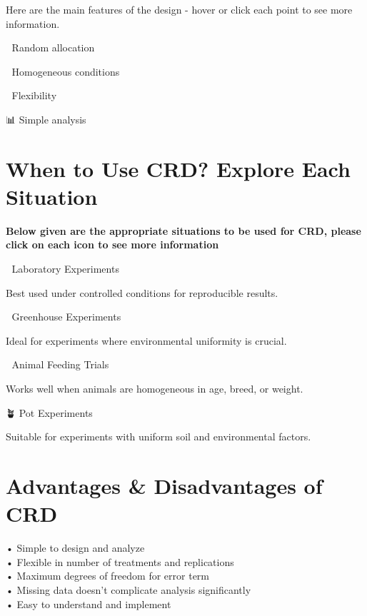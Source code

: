 \documentclass[
  letterpaper,
  DIV=11,
  numbers=noendperiod]{scrartcl}
\begin{document}
Here are the main features of the design - hover or click each point to
see more information.

{🎲 Random allocation}

{🌿 Homogeneous conditions}

{🔄 Flexibility}

{📊 Simple analysis}

\hypertarget{sec-results}{%
\section{When to Use CRD? Explore Each Situation}\label{sec-results}}

\textbf{Below given are the appropriate situations to be used for CRD,
please click on each icon to see more information}

🧪 Laboratory Experiments

Best used under controlled conditions for reproducible results.

🌱 Greenhouse Experiments

Ideal for experiments where environmental uniformity is crucial.

🐄 Animal Feeding Trials

Works well when animals are homogeneous in age, breed, or weight.

🪴 Pot Experiments

Suitable for experiments with uniform soil and environmental factors.

\hypertarget{advantages-disadvantages-of-crd}{%
\section{Advantages \& Disadvantages of
CRD}\label{advantages-disadvantages-of-crd}}

\begin{tcolorbox}[enhanced jigsaw, titlerule=0mm, title={Advantages}, bottomrule=.15mm, colback=white, opacityback=0, rightrule=.15mm, colframe=quarto-callout-tip-color-frame, toprule=.15mm, toptitle=1mm, leftrule=.75mm, left=2mm, arc=.35mm, breakable, coltitle=black, bottomtitle=1mm, colbacktitle=quarto-callout-tip-color!10!white, opacitybacktitle=0.6]

• Simple to design and analyze\\
• Flexible in number of treatments and replications\\
• Maximum degrees of freedom for error term\\
• Missing data doesn't complicate analysis significantly\\
• Easy to understand and implement\\

\end{tcolorbox}
\end{document}
